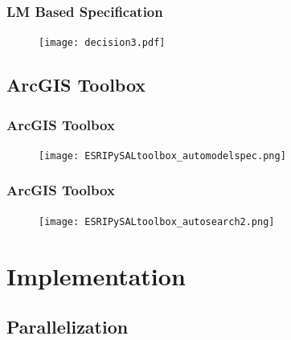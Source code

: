 \documentclass[usepdftitle=false,professionalfonts,compress ]{beamer}
\begin{document}
{
\begin{frame}\frametitle{LM Based Specification}

\begin{figure}
	\texttt{[image: decision3.pdf]}\end{figure}
\end{frame}
}





\subsection{ArcGIS Toolbox}



{
\begin{frame}\frametitle{ArcGIS Toolbox}

\begin{figure}
	\texttt{[image: ESRIPySALtoolbox\_automodelspec.png]}\end{figure}
\end{frame}
}





{
\begin{frame}\frametitle{ArcGIS Toolbox}

\begin{figure}
	\texttt{[image: ESRIPySALtoolbox\_autosearch2.png]}\end{figure}
\end{frame}
}






\section{Implementation}



\subsection{Parallelization}
\end{document}

